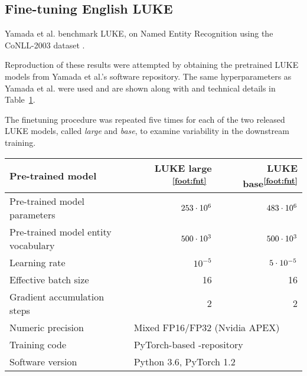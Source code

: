 \documentclass[main.tex]{subfiles}
\begin{document}
\subsection{Fine-tuning English LUKE}
Yamada et al. benchmark LUKE, on Named Entity Recognition using the CoNLL-2003 dataset \cite{yamada2020luke}.

Reproduction of these results were attempted by obtaining the pretrained LUKE models from Yamada et al.'s software repository.
The same hyperparameters as Yamada et al. were used and are shown along with and technical details in Table~\ref{tab:params}.

The finetuning procedure was repeated five times for each of the two released LUKE models, called \emph{large} and \emph{base}, to examine variability in the downstream training.
\addtocounter{footnote}{1}
\begin{table}[H]
    \centering
    \begin{tabular}{l|rr}
        Pre-trained model
                                    & LUKE large \textsuperscript{\ref{foot:fnt}}\
                                                & LUKE base\textsuperscript{\ref{foot:fnt}}\\\hline
        Pre-trained model parameters & $253\cdot10^{6}$ & $483\cdot10^{6}$\\
        Pre-trained model entity vocabulary & $500\cdot10^{3}$ & $500\cdot10^{3}$\\
        Learning rate               & $10^{-5}$ & $5\cdot10^{-5}$\\
        Effective batch size        & 16 & 16\\
        Gradient accumulation steps & 2 & 2\\
        Numeric precision           & \multicolumn{2}{l}{Mixed FP16/FP32 (Nvidia APEX)}\\
        Training code               & \multicolumn{2}{l}{PyTorch-based \code{luke}-repository \protect\footnotemark}\\
        Software version            & \multicolumn{2}{l}{Python 3.6, PyTorch 1.2}
    \end{tabular}
    \label{tab:params}
\end{table}
\end{document}
